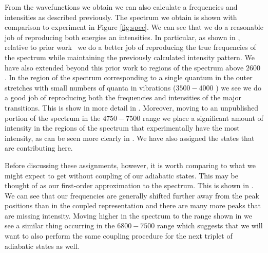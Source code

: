 %
%


From the wavefunctions we obtain we can also calculate a frequencies and intensities as described previously. The spectrum we obtain is shown with comparison to experiment in Figure \ref{fig:spec}. We can see that we do a reasonable job of reproducing both energies an intensities. In particular, as shown in , relative to prior work~\cite{Lin2012} we do a better job of reproducing the true frequencies of the spectrum while maintaining the previously calculated intensity pattern. We have also extended beyond this prior work to regions of the spectrum above \squigg$2600$ \wavenumbers{}. In the region of the spectrum corresponding to a single quantum in the outer \htwo{} stretches with small numbers of quanta in \hplus{} vibrations (\squigg$3500-4000$ \wavenumbers{}) we see we do a good job of reproducing both the frequencies and intensities of the major transitions. This is show in more detail in . Moreover, moving to an unpublished portion of the spectrum in the \squigg$4750-7500$ \wavenumbers{} range we place a significant amount of intensity in the regions of the spectrum that experimentally have the most intensity, as can be seen more clearly in . We have also assigned the states that are contributing here.


Before discussing these assignments, however, it is worth comparing to what we might expect to get without coupling of our adiabatic states. This may be thought of as our first-order approximation to the spectrum. This is shown in . We can see that our frequencies are generally shifted further away from the peak positions than in the coupled representation and there are many more peaks that are missing intensity. Moving higher in the spectrum to the range shown in  we see a similar thing occurring in the \squigg$6800-7500$ \wavenumbers{} range which suggests that we will want to also perform the same coupling procedure for the next triplet of adiabatic states as well.

%
